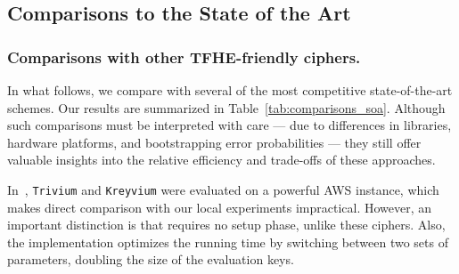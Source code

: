 \begin{table}[t!]
  \centering
  \caption{Size of the server keys for the two considered sets of parameters. 
    \label{tab:server_key_size}}
  
  \renewcommand{\arraystretch}{1.2}  %
\end{table}




\subsection{Comparisons to the State of the Art}
\label{sec:perfs_soa}	

\subsubsection{Comparisons with other TFHE-friendly ciphers.} 
In what follows, we compare \coolName with several of the most competitive state-of-the-art schemes. Our results are summarized in Table~\ref{tab:comparisons_soa}.
Although such comparisons must be interpreted with care — due to differences in libraries, hardware platforms, and bootstrapping error probabilities — they still offer valuable insights into the relative efficiency and trade-offs of these approaches.


In~\cite{DBLP:conf/wahc/BalenboisOS23}, \texttt{Trivium} and \texttt{Kreyvium} were evaluated on a powerful AWS instance, which makes direct comparison with our local experiments impractical. However, an important distinction is that \coolName requires no setup phase, unlike these ciphers. Also, the implementation optimizes the running time by switching between two sets of parameters, doubling the size of the evaluation keys.

